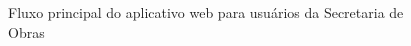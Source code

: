 \documentclass[
	article,			%
	11pt,				%
	oneside,			%
	a4paper,			%
	english,			%
	brazil,				%
	sumario=tradicional
	]{abntex2}
\begin{document}
\begin{figure}[!htbp]
 \centering
 \caption{\label{fluxo-site-sec}Fluxo principal do aplicativo web para usuários da Secretaria de Obras}
\end{figure}
\end{document}
